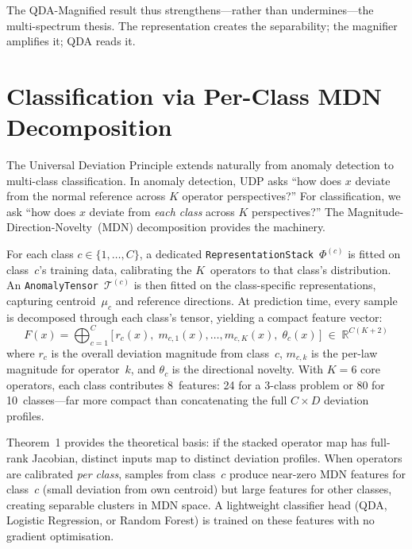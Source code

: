 \documentclass[journal]{IEEEtran}
\begin{document}
The QDA-Magnified result thus strengthens---rather than undermines---the multi-spectrum thesis. The representation creates the separability; the magnifier amplifies it; QDA reads it.

\section{Classification via Per-Class MDN Decomposition}
\label{sec:classification}

The Universal Deviation Principle extends naturally from anomaly detection to multi-class classification.  In anomaly detection, UDP asks ``how does $x$ deviate from the normal reference across $K$ operator perspectives?''  For classification, we ask ``how does $x$ deviate from \emph{each class} across $K$ perspectives?''  The Magnitude-Direction-Novelty~(MDN) decomposition provides the machinery.

For each class $c \in \{1, \ldots, C\}$, a dedicated \texttt{RepresentationStack}~$\Phi^{(c)}$ is fitted on class~$c$'s training data, calibrating the $K$~operators to that class's distribution.  An \texttt{AnomalyTensor}~$\mathcal{T}^{(c)}$ is then fitted on the class-specific representations, capturing centroid~$\mu_c$ and reference directions.  At prediction time, every sample is decomposed through each class's tensor, yielding a compact feature vector:
\begin{equation}
  F(x) = \bigoplus_{c=1}^{C} \bigl[\, r_c(x),\; m_{c,1}(x), \ldots, m_{c,K}(x),\; \theta_c(x) \,\bigr]
         \;\in\; \mathbb{R}^{C(K{+}2)}
  \label{eq:classification}
\end{equation}
where $r_c$ is the overall deviation magnitude from class~$c$, $m_{c,k}$ is the per-law magnitude for operator~$k$, and $\theta_c$ is the directional novelty.  With $K{=}6$ core operators, each class contributes 8~features: 24 for a 3-class problem or 80 for 10~classes---far more compact than concatenating the full $C \times D$ deviation profiles.

Theorem~1 provides the theoretical basis: if the stacked operator map has full-rank Jacobian, distinct inputs map to distinct deviation profiles.  When operators are calibrated \emph{per class}, samples from class~$c$ produce near-zero MDN features for class~$c$ (small deviation from own centroid) but large features for other classes, creating separable clusters in MDN space.  A lightweight classifier head (QDA, Logistic Regression, or Random Forest) is trained on these features with no gradient optimisation.
\end{document}
